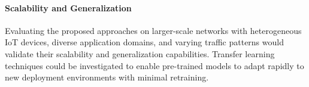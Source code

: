 \documentclass[preprint,3p,authoryear]{elsarticle}
\begin{document}
\paragraph{Scalability and Generalization}
Evaluating the proposed approaches on larger-scale networks with heterogeneous IoT devices, diverse application domains, and varying traffic patterns would validate their scalability and generalization capabilities. Transfer learning techniques could be investigated to enable pre-trained models to adapt rapidly to new deployment environments with minimal retraining.


  
 
\end{document}
